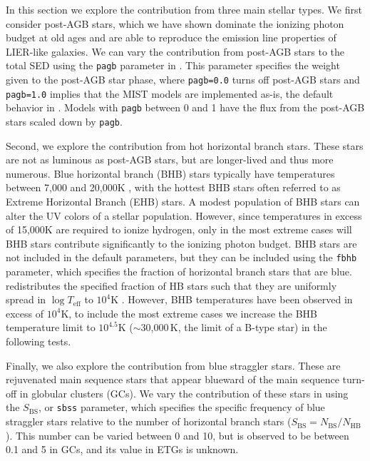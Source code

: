 In this section we explore the contribution from three main stellar types. We first consider post-AGB stars, which we have shown dominate the ionizing photon budget at old ages and are able to reproduce the emission line properties of LIER-like galaxies. We can vary the contribution from post-AGB stars to the total SED using the {\tt pagb} parameter in \FSPS. This parameter specifies the weight given to the post-AGB star phase, where {\tt pagb=0.0} turns off post-AGB stars and {\tt pagb=1.0} implies that the MIST models are implemented as-is, the default behavior in \FSPS. Models with {\tt pagb} between 0 and 1 have the flux from the post-AGB stars scaled down by {\tt pagb}.

Second, we explore the contribution from hot horizontal branch stars. These stars are not as luminous as post-AGB stars, but are longer-lived and thus more numerous. Blue horizontal branch (BHB) stars typically have temperatures between 7,000 and 20,000K \citep{Schiavon+2004}, with the hottest BHB stars often referred to as Extreme Horizontal Branch (EHB) stars. A modest population of BHB stars can alter the UV colors of a stellar population. However, since temperatures in excess of 15,000K are required to ionize hydrogen, only in the most extreme cases will BHB stars contribute significantly to the ionizing photon budget. BHB stars are not included in the default \FSPS parameters, but they can be included using the {\tt fbhb} parameter, which specifies the fraction of horizontal branch stars that are blue. \FSPS redistributes the specified fraction of HB stars such that they are uniformly spread in $\log T_{\mathrm{eff}}$ to $10^4$K \citep[e.g.,][]{Sarajedini+2007}. However, BHB temperatures have been observed in excess of $10^4$K, to include the most extreme cases we increase the BHB temperature limit to $10^{4.5}$K (${\sim}$30,000$\,$K, the limit of a B-type star) in the following tests.

Finally, we also explore the contribution from blue straggler stars. These are rejuvenated main sequence stars that appear blueward of the main sequence turn-off in globular clusters (GCs). We vary the contribution of these stars in \FSPS using the $S_{\mathrm{BS}}$, or {\tt sbss} parameter, which specifies the specific frequency of blue straggler stars relative to the number of horizontal branch stars ($S_{\mathrm{BS}} = N_{\mathrm{BS}} / N_{\mathrm{HB}}$). This number can be varied between 0 and 10, but is observed to be between 0.1 and 5 in GCs, and its value in ETGs is unknown.

